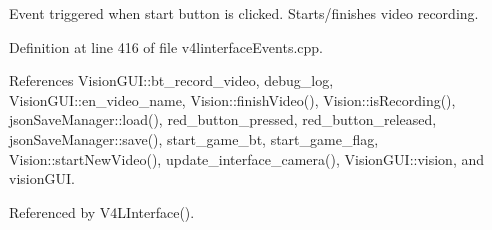 Event triggered when start button is clicked. Starts/finishes video recording. 



Definition at line 416 of file v4linterface\+Events.\+cpp.



References Vision\+G\+U\+I\+::bt\+\_\+record\+\_\+video, debug\+\_\+log, Vision\+G\+U\+I\+::en\+\_\+video\+\_\+name, Vision\+::finish\+Video(), Vision\+::is\+Recording(), json\+Save\+Manager\+::load(), red\+\_\+button\+\_\+pressed, red\+\_\+button\+\_\+released, json\+Save\+Manager\+::save(), start\+\_\+game\+\_\+bt, start\+\_\+game\+\_\+flag, Vision\+::start\+New\+Video(), update\+\_\+interface\+\_\+camera(), Vision\+G\+U\+I\+::vision, and vision\+G\+UI.



Referenced by V4\+L\+Interface().


